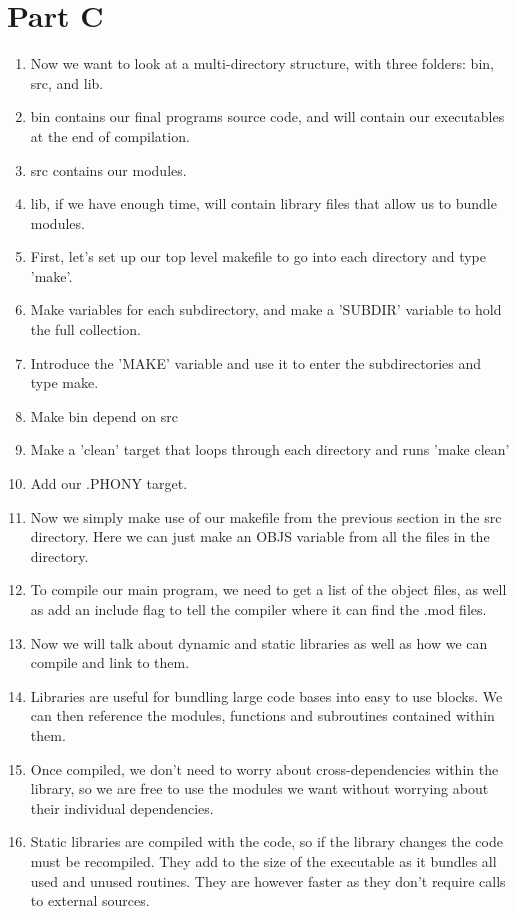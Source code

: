 \documentclass{article}
\begin{document}
\section{Part C}
\begin{enumerate}
\item Now we want to look at a multi-directory structure, with three folders: bin, src, and lib.
\item bin contains our final programs source code, and will contain our executables at the end of compilation.
\item src contains our modules.
\item lib, if we have enough time, will contain library files that allow us to bundle modules.
\item First, let's set up our top level makefile to go into each directory and type 'make'.
\item Make variables for each subdirectory, and make a 'SUBDIR' variable to hold the full collection.
\item Introduce the 'MAKE' variable and use it to enter the subdirectories and type make.
\item Make bin depend on src
\item Make a 'clean' target that loops through each directory and runs 'make clean'
\item Add our .PHONY target.
\item Now we simply make use of our makefile from the previous section in the src directory. Here we can just make an OBJS variable from all the files in the directory.
\item To compile our main program, we need to get a list of the object files, as well as add an include flag to tell the compiler where it can find the .mod files.
\item Now we will talk about dynamic and static libraries as well as how we can compile and link to them.
\item Libraries are useful for bundling large code bases into easy to use blocks. We can then reference the modules, functions and subroutines contained within them.
\item Once compiled, we don't need to worry about cross-dependencies within the library, so we are free to use the modules we want without worrying about their individual dependencies.
\item Static libraries are compiled with the code, so if the library changes the code must be recompiled. They add to the size of the executable as it bundles all used and unused routines. They are however faster as they don't require calls to external sources.

\end{enumerate}
\end{document}
